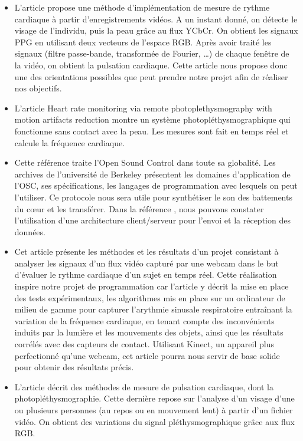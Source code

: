 \documentclass[12 pt]{article}
\begin{document}
\begin{itemize}
\item L'article \cite{Ufuk} propose une méthode d'implémentation de mesure de rythme cardiaque à partir d'enregistrements vidéos. A un instant donné, on détecte le visage de l'individu, puis la peau grâce au flux YCbCr. On obtient les signaux PPG en utilisant deux vecteurs de l'espace RGB. Après avoir traité les signaux (filtre passe-bande, transformée de Fourier, …) de chaque fenêtre de la vidéo, on obtient la pulsation cardiaque. Cette article nous propose donc une des orientations possibles que peut prendre notre projet afin de réaliser nos objectifs.
\newline
\item L'article \cite{Cenn} Heart rate monitoring via remote photoplethysmography with motion artifacts reduction montre un système photopléthysmographique qui fonctionne sans contact avec la peau. Les mesures sont fait en temps réel et calcule la fréquence cardiaque.
\newline
\item Cette référence\cite{Wri03} traite l'Open Sound Control dans toute sa globalité. Les archives de l'université de Berkeley  présentent les domaines d'application de l'OSC, ses spécifications, les langages de programmation avec lesquels on peut l'utiliser. Ce protocole nous sera utile pour synthétiser le son des battements du cœur et les transférer. Dans la référence \cite{Wri03}, nous pouvons constater l'utilisation d'une architecture client/serveur pour l'envoi et la réception des données. 
\newpage
\item Cet article \cite{Bous} présente les méthodes et les résultats d'un projet consistant à analyser les signaux d'un flux vidéo capturé par une webcam dans le but d'évaluer le rythme cardiaque d'un sujet en temps réel. Cette réalisation inspire notre projet de programmation car l'article y décrit la mise en place des tests expérimentaux, les algorithmes mis en place sur un ordinateur de milieu de gamme pour capturer l'arythmie sinusale respiratoire entraînant la variation de la fréquence cardiaque, en tenant compte des inconvénients induits par la lumière et les mouvements des objets, ainsi que les résultats corrélés avec des capteurs de contact.
Utilisant Kinect, un appareil plus perfectionné qu'une webcam, cet article pourra nous servir de base solide pour obtenir des résultats précis.
\newline
\item L'article \cite{Kran} décrit des méthodes de mesure de pulsation cardiaque, dont la photopléthysmographie. Cette dernière repose sur l'analyse d'un visage d'une ou plusieurs personnes (au repos ou en mouvement lent) à partir d'un fichier vidéo. On obtient des variations du signal pléthysmographique grâce aux flux RGB.

\end{itemize}
\end{document}
